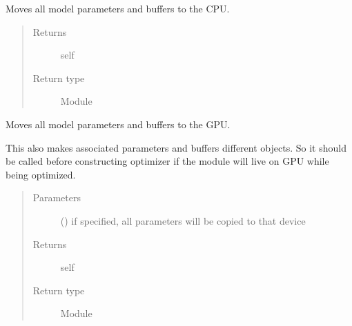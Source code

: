 \documentclass[letterpaper,10pt,english]{sphinxmanual}
\begin{document}
\begin{fulllineitems}
\begin{fulllineitems}
\begin{quote}
\begin{description}
\end{description}\end{quote}

\end{fulllineitems}


\begin{fulllineitems}
\label{\detokenize{api/autoencoding:geology.metamodelling.SpatialAutoencoder.cpu}}
Moves all model parameters and buffers to the CPU.
\begin{quote}\begin{description}
\item[{Returns}] \leavevmode
self

\item[{Return type}] \leavevmode
Module

\end{description}\end{quote}

\end{fulllineitems}


\begin{fulllineitems}
\label{\detokenize{api/autoencoding:geology.metamodelling.SpatialAutoencoder.cuda}}
Moves all model parameters and buffers to the GPU.

This also makes associated parameters and buffers different objects. So
it should be called before constructing optimizer if the module will
live on GPU while being optimized.
\begin{quote}\begin{description}
\item[{Parameters}] \leavevmode
{} (\sphinxstyleliteralemphasis{\sphinxupquote{, }}) \textendash{} if specified, all parameters will be
copied to that device

\item[{Returns}] \leavevmode
self

\item[{Return type}] \leavevmode
Module


\end{description}
\end{quote}
\end{fulllineitems}
\end{fulllineitems}
\end{document}
